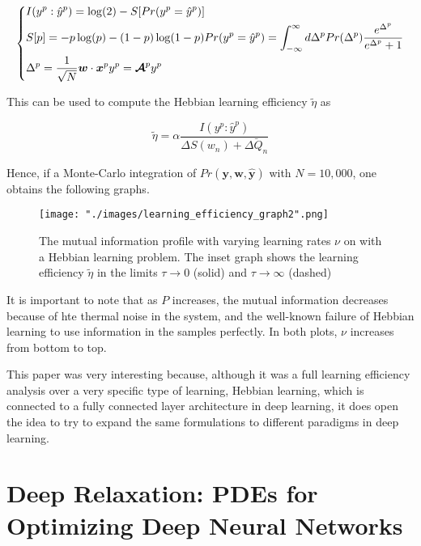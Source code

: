 \begin{equation*}
\begin{dcases}
I(y^p:\hat{y}^p) = \log(2) - S[Pr(y^p = \hat{y}^p)] \\
S[p] = -p \log(p) - (1-p) \log(1-p)
Pr(y^p = \hat{y}^p) = \int_{-\infty}^\infty d\Delta^p Pr(\Delta^p) \frac{e^{\Delta^p}}{e^{\Delta^p} + 1} \\
\Delta^p = \frac{1}{\sqrt{N}} \bm{w} \cdot \bm{x}^p y^p = \bm{\mathcal{A}}^p y^p
\end{dcases}
\end{equation*}

This can be used to compute the Hebbian learning efficiency $\tilde{\eta}$ as

$$\tilde{\eta} = \alpha \frac{I(y^p:\hat{y}^p)}{\Delta S(w_n) + \bar{\Delta Q_n}}$$

Hence, if a Monte-Carlo integration of $Pr(\bm{y},\bm{w},\hat{\bm{y}})$ with $N=10,000$, one obtains the following graphs.
\begin{figure}[ht]
\begin{center}
    \texttt{[image: "./images/learning\_efficiency\_graph2".png]}
    \caption{The mutual information profile with varying learning rates $\nu$ on with a Hebbian learning problem. The inset graph shows the learning efficiency $\tilde{\eta}$ in the limits $\tau \rightarrow 0$ (solid) and $\tau \rightarrow \infty$ (dashed)}
    \label{fig::learning_efficiency2}
\end{center}
\end{figure}

It is important to note that as $P$ increases, the mutual information decreases because of hte thermal noise in the system, and the well-known failure of Hebbian learning to use information in the samples perfectly. In both plots, $\nu$ increases from bottom to top.

This paper was very interesting because, although it was a full learning efficiency analysis over a very specific type of learning, Hebbian learning, which is connected to a fully connected layer architecture in deep learning, it does open the idea to try to expand the same formulations to different paradigms in deep learning.

\section{Deep Relaxation: PDEs for Optimizing Deep Neural Networks \cite{deeprelaxation}}

